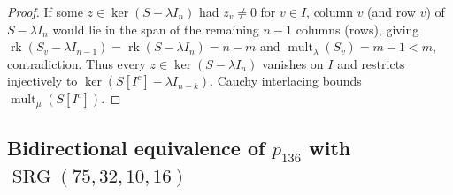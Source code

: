 \documentclass[11pt,reqno]{amsart}
\theoremstyle{definition}
\theoremstyle{remark}
\DeclareMathOperator{\rk}{rk}
\DeclareMathOperator{\SRG}{SRG}
\DeclareMathOperator{\mult}{mult}
\begin{document}
\begin{proof}
If some $z \in \ker(S - \lambda I_n)$ had $z_v \neq 0$ for $v \in I$, column $v$ (and row $v$) of $S - \lambda I_n$ would lie in the span of the remaining $n-1$ columns (rows), giving $\rk(S_v - \lambda I_{n-1}) = \rk(S - \lambda I_n) = n - m$ and $\mult_\lambda(S_v) = m - 1 < m$, contradiction. Thus every $z \in \ker(S - \lambda I_n)$ vanishes on $I$ and restricts injectively to $\ker(S[I^c] - \lambda I_{n-k})$. Cauchy interlacing bounds $\mult_\mu(S[I^c])$.
\end{proof}

\subsection{Bidirectional equivalence of \texorpdfstring{$p_{136}$}{p\_136} with \texorpdfstring{$\SRG(75, 32, 10, 16)$}{SRG(75, 32, 10, 16)}}
\end{document}
